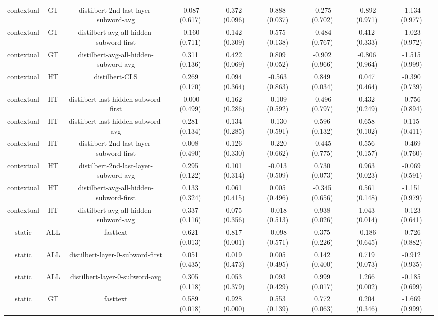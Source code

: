 \begin{sidewaystable}[htb]
\begin{tabular}{@{}ccccccccc@{}}
        contextual & GT & distilbert-2nd-last-layer-subword-avg & -0.087 (0.617) & 0.372 (0.096) & 0.888 (0.037) & -0.275 (0.702) & -0.892 (0.971) & -1.134 (0.977) \\
        contextual & GT & distilbert-avg-all-hidden-subword-first & -0.160 (0.711) & 0.142 (0.309) & 0.575 (0.138) & -0.484 (0.767) & 0.412 (0.333) & -1.023 (0.972) \\
        contextual & GT & distilbert-avg-all-hidden-subword-avg & 0.311 (0.136) & 0.422 (0.069) & 0.809 (0.052) & -0.902 (0.966) & -0.806 (0.964) & -1.515 (0.999) \\
        contextual & HT & distilbert-CLS & 0.269 (0.170) & 0.094 (0.364) & -0.563 (0.863) & 0.849 (0.034) & 0.047 (0.464) & -0.390 (0.739) \\
        contextual & HT & distilbert-last-hidden-subword-first & -0.000 (0.499) & 0.162 (0.286) & -0.109 (0.592) & -0.496 (0.797) & 0.432 (0.249) & -0.756 (0.894) \\
        contextual & HT & distilbert-last-hidden-subword-avg & 0.281 (0.134) & 0.134 (0.285) & -0.130 (0.591) & 0.596 (0.132) & 0.658 (0.102) & 0.115 (0.411) \\
        contextual & HT & distilbert-2nd-last-layer-subword-first & 0.008 (0.490) & 0.126 (0.330) & -0.220 (0.662) & -0.445 (0.775) & 0.556 (0.157) & -0.469 (0.760) \\
        contextual & HT & distilbert-2nd-last-layer-subword-avg & 0.295 (0.122) & 0.101 (0.314) & -0.013 (0.509) & 0.730 (0.073) & 0.963 (0.023) & -0.069 (0.591) \\
        contextual & HT & distilbert-avg-all-hidden-subword-first & 0.133 (0.324) & 0.061 (0.415) & 0.005 (0.496) & -0.345 (0.656) & 0.561 (0.148) & -1.151 (0.979) \\
        contextual & HT & distilbert-avg-all-hidden-subword-avg & 0.337 (0.116) & 0.075 (0.356) & -0.018 (0.513) & 0.938 (0.026) & 1.043 (0.014) & -0.123 (0.641) \\
        static & ALL & fasttext & 0.621 (0.013) & 0.817 (0.001) & -0.098 (0.571) & 0.375 (0.226) & -0.186 (0.645) & -0.726 (0.882) \\
        static & ALL & distilbert-layer-0-subword-first & 0.051 (0.435) & 0.019 (0.473) & 0.005 (0.495) & 0.142 (0.400) & 0.719 (0.073) & -0.912 (0.935) \\
        static & ALL & distilbert-layer-0-subword-avg & 0.305 (0.118) & 0.053 (0.379) & 0.093 (0.429) & 0.999 (0.017) & 1.266 (0.002) & -0.185 (0.699) \\
        static & GT & fasttext & 0.589 (0.018) & 0.928 (0.000) & 0.553 (0.139) & 0.772 (0.063) & 0.204 (0.346) & -1.669 (0.999) \\

\end{tabular}
\end{sidewaystable}
